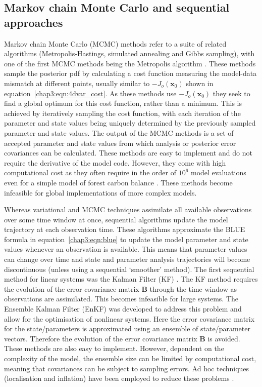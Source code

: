 \subsection{Markov chain Monte Carlo and sequential approaches} \label{chap3:sec:mcmc_seq}

Markov chain Monte Carlo (MCMC) methods refer to a suite of related algorithms (Metropolis-Hastings, simulated annealing and Gibbs sampling), with one of the first MCMC methods being the Metropolis algorithm \citep{metropolis1953equation}. These methods sample the posterior pdf by calculating a cost function measuring the model-data mismatch at different points, usually similar to \(-J_o(\textbf{x}_0)\) shown in equation~\eqref{chap3:eqn:4dvar_cost}. As these methods use \(-J_o(\textbf{x}_0)\) they seek to find a global optimum for this cost function, rather than a minimum. This is achieved by iteratively sampling the cost function, with each iteration of the parameter and state values being uniquely determined by the previously sampled parameter and state values. The output of the MCMC methods is a set of accepted parameter and state values from which analysis or posterior error covariances can be calculated. These methods are easy to implement and do not require the derivative of the model code. However, they come with high computational cost as they often require in the order of \(10^{6}\) model evaluations even for a simple model of forest carbon balance \citep{zobitz2011primer, ziehn2012}. These methods become infeasible for global implementations of more complex models. 

Whereas variational and MCMC techniques assimilate all available observations over some time window at once, sequential algorithms update the model trajectory at each observation time. These algorithms approximate the BLUE formula in equation~\eqref{chap3:eqn:blue} to update the model parameter and state values whenever an observation is available. This means that parameter values can change over time and state and parameter analysis trajectories will become discontinuous (unless using a sequential `smoother' method). The first sequential method for linear systems was the Kalman Filter (KF) \citep{kalman1960}. The KF method requires the evolution of the error covariance matrix \textbf{B} through the time window as observations are assimilated. This becomes infeasible for large systems. The Ensemble Kalman Filter (EnKF) \citep{Evensen2003} was developed to address this problem and allow for the optimisation of nonlinear systems. Here the error covariance matrix for the state/parameters is approximated using an ensemble of state/parameter vectors. Therefore the evolution of the error covariance matrix \textbf{B} is avoided. These methods are also easy to implement. However, dependent on the complexity of the model, the ensemble size can be limited by computational cost, meaning that covariances can be subject to sampling errors. Ad hoc techniques (localisation and inflation) have been employed to reduce these problems \citep{Hamill2001, andersonandanderson1999}.

